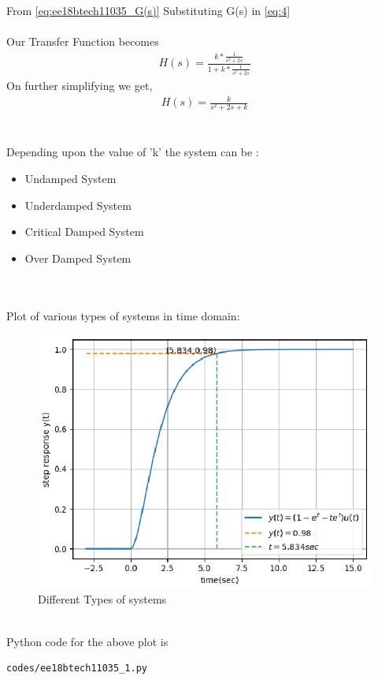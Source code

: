 \begin{enumerate}[label=\thesection.\arabic*.,ref=\thesection.\theenumi]
From \eqref{eq:ee18btech11035_G(s)} Substituting G(s) in \eqref{eq:4} \\
\\Our Transfer Function becomes 
\begin{align}
H(s) = \frac{k*\frac{1}{s^2+2s}}{1+k*\frac{1}{s^2+2s}}
\end{align}
On further simplifying we get,\\
\begin{align}
H(s) = \frac{k}{s^2+2s+k}
\label{eq:H(s)}
\end{align}\\
\\
Depending upon the value of 'k' the system can be : \\
\begin{itemize}
    
\item Undamped System
\item Underdamped System
\item Critical Damped System
\item Over Damped System 

\end{itemize}
\\
\\Plot of various types of systems in time domain:
\\
\begin{figure}[!h]
\includegraphics[width=\columnwidth]{./figures/ee18btech11035_1.eps}
\caption{Different Types of systems}
\label{fig:ee18btech11035_different_systems}
\end{figure}\\
Python code for the above plot is
\begin{lstlisting}
codes/ee18btech11035_1.py
\end{lstlisting}


\end{enumerate}
